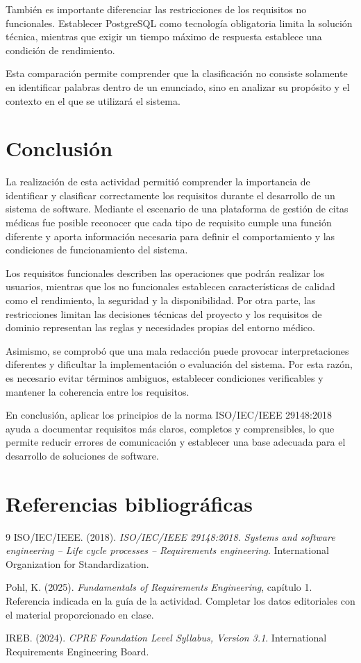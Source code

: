 \documentclass[12pt,a4paper]{article}
\begin{document}
También es importante diferenciar las restricciones de los requisitos no funcionales. Establecer PostgreSQL como tecnología obligatoria limita la solución técnica, mientras que exigir un tiempo máximo de respuesta establece una condición de rendimiento.

Esta comparación permite comprender que la clasificación no consiste solamente en identificar palabras dentro de un enunciado, sino en analizar su propósito y el contexto en el que se utilizará el sistema.

\section{Conclusión}

La realización de esta actividad permitió comprender la importancia de identificar y clasificar correctamente los requisitos durante el desarrollo de un sistema de software. Mediante el escenario de una plataforma de gestión de citas médicas fue posible reconocer que cada tipo de requisito cumple una función diferente y aporta información necesaria para definir el comportamiento y las condiciones de funcionamiento del sistema.

Los requisitos funcionales describen las operaciones que podrán realizar los usuarios, mientras que los no funcionales establecen características de calidad como el rendimiento, la seguridad y la disponibilidad. Por otra parte, las restricciones limitan las decisiones técnicas del proyecto y los requisitos de dominio representan las reglas y necesidades propias del entorno médico.

Asimismo, se comprobó que una mala redacción puede provocar interpretaciones diferentes y dificultar la implementación o evaluación del sistema. Por esta razón, es necesario evitar términos ambiguos, establecer condiciones verificables y mantener la coherencia entre los requisitos.

En conclusión, aplicar los principios de la norma ISO/IEC/IEEE 29148:2018 ayuda a documentar requisitos más claros, completos y comprensibles, lo que permite reducir errores de comunicación y establecer una base adecuada para el desarrollo de soluciones de software.

\section{Referencias bibliográficas}

\begin{thebibliography}{9}
    ISO/IEC/IEEE. (2018).
    \textit{ISO/IEC/IEEE 29148:2018. Systems and software engineering -- Life cycle processes -- Requirements engineering}.
    International Organization for Standardization.

    Pohl, K. (2025).
    \textit{Fundamentals of Requirements Engineering}, capítulo 1.
    Referencia indicada en la guía de la actividad. Completar los datos editoriales con el material proporcionado en clase.

    IREB. (2024).
    \textit{CPRE Foundation Level Syllabus, Version 3.1}.
    International Requirements Engineering Board.
\end{thebibliography}
\end{document}
